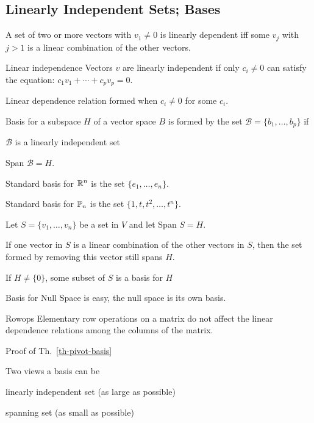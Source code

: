 \begin{card}
    \subsection{Linearly Independent Sets; Bases}

    \begin{theorem}
    A set of two or more vectors with $v_1 \neq 0$ is
    linearly dependent iff some $v_j$ with $j > 1$ is a linear combination
    of the other vectors.
    \end{theorem}

    \begin{compactdesc}
    \item[Linear independence] Vectors $v$ are linearly independent
        if only $c_i \neq 0$ can satisfy
        the equation: $c_1 v_1 + \dotsb + c_p v_p = 0$.
    \item[Linear dependence relation] formed when $c_i \neq 0$ for some $c_i$.
    \item[Basis] for a subspace $H$ of a vector space $B$ is formed by the
        set $\mathcal{B} = \{b_1, \dotsc, b_p \}$ if
        \begin{compactenum}
        \item $\mathcal{B}$ is a linearly independent set
        \item Span $\mathcal{B} = H$.
        \end{compactenum}
    \item[Standard basis] for $\mathbb{R}^n$ is the set $\{e_1, \dotsc, e_n \}$.
    \item[Standard basis] for $\mathbb{P}_n$ is the set $\{ 1, t, t^2, \dotsc, t^n \}$.
    \end{compactdesc}

    \begin{theorem}
    Let $S = \{v_1, \dotsc, v_n \}$ be a set in $V$ and let Span $S = H$.
    \begin{compactenum}
    \item If one vector in $S$ is a linear combination of the other vectors
        in $S$, then the set formed by removing this vector still spans $H$.
    \item If $H \neq \{0\}$, some subset of $S$ is a basis for $H$
    \end{compactenum}
    \end{theorem}

    \begin{compactdesc}
    \item[Basis for Null Space] is easy, the null space is its own basis.
    \item[Rowops] Elementary row operations on a matrix do not affect the
        linear dependence relations among the columns of the matrix.
    \item[Proof of Th.~\ref{th-pivot-basis}]
    \item[Two views] a basis can be
    \begin{compactenum}
    \item linearly independent set (as large as possible)
    \item spanning set (as small as possible)
    \end{compactenum}


\end{compactdesc}
\end{card}
